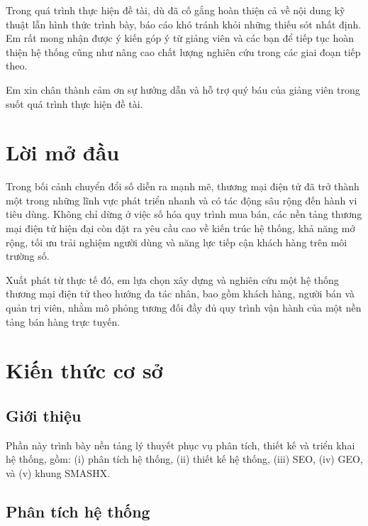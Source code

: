 \documentclass[13pt]{article}
\begin{document}
Trong quá trình thực hiện đề tài, dù đã cố gắng hoàn thiện cả về nội dung kỹ thuật lẫn hình thức trình bày, báo cáo khó tránh khỏi những thiếu sót nhất định. 
Em rất mong nhận được ý kiến góp ý từ giảng viên và các bạn để tiếp tục hoàn thiện hệ thống cũng như nâng cao chất lượng nghiên cứu trong các giai đoạn tiếp theo.

Em xin chân thành cảm ơn sự hướng dẫn và hỗ trợ quý báu của giảng viên trong suốt quá trình thực hiện đề tài.
\newpage
\tableofcontents
{} 
\thispagestyle{fancy}  %
\pagestyle{fancy} 
\newpage
\listoffigures 
\thispagestyle{fancy}  %
\pagestyle{fancy} 
\newpage
\listoftables
\thispagestyle{fancy}  %
\pagestyle{fancy} 
\newpage
\section*{Lời mở đầu}
Trong bối cảnh chuyển đổi số diễn ra mạnh mẽ, thương mại điện tử đã trở thành một trong những lĩnh vực phát triển nhanh và có tác động sâu rộng đến hành vi tiêu dùng. Không chỉ dừng ở việc số hóa quy trình mua bán, các nền tảng thương mại điện tử hiện đại còn đặt ra yêu cầu cao về kiến trúc hệ thống, khả năng mở rộng, tối ưu trải nghiệm người dùng và năng lực tiếp cận khách hàng trên môi trường số.

Xuất phát từ thực tế đó, em lựa chọn xây dựng và nghiên cứu một hệ thống thương mại điện tử theo hướng đa tác nhân, bao gồm khách hàng, người bán và quản trị viên, nhằm mô phỏng tương đối đầy đủ quy trình vận hành của một nền tảng bán hàng trực tuyến.

\newpage
\section{Kiến thức cơ sở}

\subsection{Giới thiệu}
Phần này trình bày nền tảng lý thuyết phục vụ phân tích, thiết kế và triển khai hệ thống, gồm:
(i) phân tích hệ thống, (ii) thiết kế hệ thống, (iii) SEO, (iv) GEO, và (v) khung SMASHX.

\subsection{Phân tích hệ thống}
\end{document}
